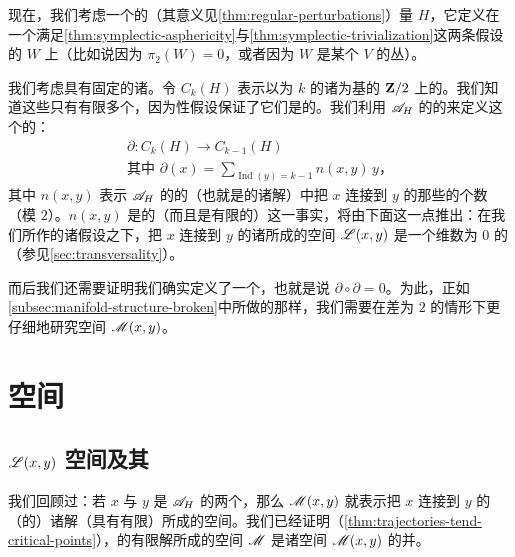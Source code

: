 
现在，我们考虑一个\trGeneric{}的（其意义见\cref{thm:regular-perturbations}）\trHamiltonian{}量 $H$，它定义在一个满足\cref{thm:symplectic-asphericity}与\cref{thm:symplectic-trivialization}这两条假设的\trSymplectic\trManifold{} $W$ 上（比如说因为 $\pi_{2}(W)=0$，或者因为 $W$ 是某个\trManifold{} $V$ 的\trCotangent{}丛）。

我们考虑具有固定\trMaslovIndex{}的诸\trPeriodic\trTrajectory。令 $C_{k}(H)$ 表示以\trMaslovIndex{}为 $k$ 的诸\trPeriodic\trTrajectory{}为基的 $\mathbf{Z}/2$ 上的\trVectorSpace。我们知道这些\trTrajectory{}只有有限多个，因为\trNondegenerate{}性假设保证了它们是\trIsolated{}的。我们利用\trActionFunctional{} $\mathscr{A}_{H}$ 的\trGradient{}的\trFlow{}来定义这个\trComplex{}的\trDifferential：
\[
\begin{array}{c}
\partial\colon C_{k}(H)\longrightarrow C_{k-1}(H)\\[6pt]
\text{其中 }\partial(x)=\displaystyle\sum_{\operatorname{Ind}(y)=k-1}n(x,y)\,y\text{，}
\end{array}
\]
其中 $n(x,y)$ 表示 $\mathscr{A}_{H}$ 的\trGradient{}的\trTrajectory{}（也就是\trFloerEquation{}的诸解）中把 $x$ 连接到 $y$ 的那些的个数（模 $2$）。$n(x,y)$ 是\trWellDefined{}的（而且是有限的）这一事实，将由下面这一点推出：在我们所作的诸假设之下，把 $x$ 连接到 $y$ 的诸\trTrajectory{}所成的空间 $\mathscr{L}(x,y)$ 是一个维数为 $0$ 的\trCompact\trManifold（参见\cref{sec:transversality}）。

而后我们还需要证明我们确实定义了一个\trComplex，也就是说 $\partial\circ\partial=0$。为此，正如\cref{subsec:manifold-structure-broken}中所做的那样，我们需要在\trIndex{}差为 $2$ 的情形下更仔细地研究空间 $\mathscr{M}(x,y)$。

\section{\trTrajectory{}空间}
\label{sec:trajectory-spaces}

\subsection{$\mathscr{L}(x,y)$ 空间及其\trTopology}
\label{subsec:space-l-topology}

我们回顾过：若 $x$ 与 $y$ 是 $\mathscr{A}_{H}$ 的两个\trCriticalPoint，那么 $\mathscr{M}(x,y)$ 就表示把 $x$ 连接到 $y$ 的（\trContractible{}的）诸解（具有有限\trEnergy）所成的空间。我们已经证明（\cref{thm:trajectories-tend-critical-points}），\trFloerEquation{}的\trContractible{}有限\trEnergy{}解所成的空间 $\mathscr{M}$ 是诸空间 $\mathscr{M}(x,y)$ 的并。

